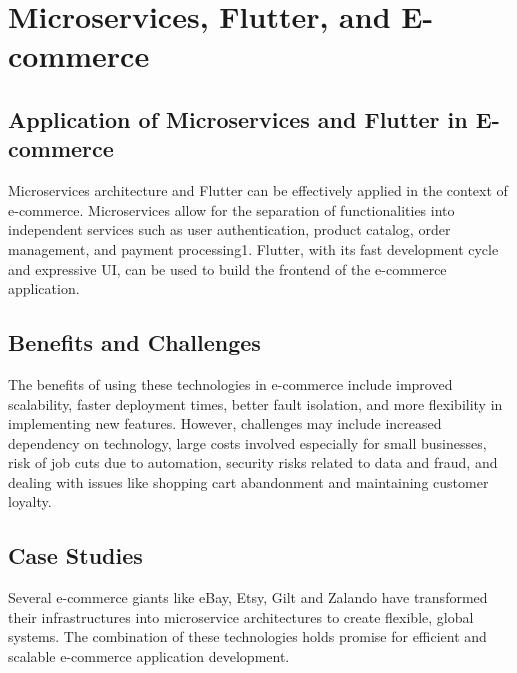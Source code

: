 \section{Microservices, Flutter, and E-commerce}

\subsection{Application of Microservices and Flutter in E-commerce}
Microservices architecture and Flutter can be effectively applied in the context of e-commerce. Microservices allow for the separation of functionalities into independent services such as user authentication, product catalog, order management, and payment processing1. Flutter, with its fast development cycle and expressive UI, can be used to build the frontend of the e-commerce application.

\subsection{Benefits and Challenges}
The benefits of using these technologies in e-commerce include improved scalability, faster deployment times, better fault isolation, and more flexibility in implementing new features. However, challenges may include increased dependency on technology, large costs involved especially for small businesses, risk of job cuts due to automation, security risks related to data and fraud, and dealing with issues like shopping cart abandonment and maintaining customer loyalty.

\subsection{Case Studies}
Several e-commerce giants like eBay, Etsy, Gilt and Zalando have transformed their infrastructures into microservice architectures to create flexible, global systems. The combination of these technologies holds promise for efficient and scalable e-commerce application development.